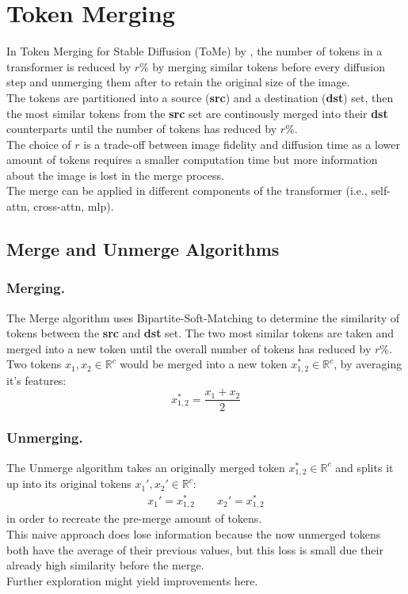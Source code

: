 \section{Token Merging}
In Token Merging for Stable Diffusion (ToMe) by \cite{bolya2023tomesd}, the number of tokens in a transformer is reduced by \(r\)\% by merging similar tokens before every diffusion step and unmerging them after to retain the original size of the image.\\
The tokens are partitioned into a source (\textbf{src}) and a destination (\textbf{dst}) set, then the most similar tokens from the \textbf{src} set are continously merged into their \textbf{dst} counterparts until the number of tokens has reduced by \(r\)\%.\\
The choice of \(r\) is a trade-off between image fidelity and diffusion time as a lower amount of tokens requires a smaller computation time but more information about the image is lost in the merge process.\\
The merge can be applied in different components of the transformer (i.e., self-attn, cross-attn, mlp).



\subsection{Merge and Unmerge Algorithms}
\subsubsection*{Merging.} The Merge algorithm uses Bipartite-Soft-Matching to determine the similarity of tokens between the \textbf{src} and \textbf{dst} set. The two most similar tokens are taken and merged into a new token until the overall number of tokens has reduced by \(r\%\).\\
Two tokens \(x_1, x_2 \in \mathbb{R}^c\) would be merged into a new token \(x_{1,2}^* \in \mathbb{R}^c \), by averaging it's features: \[x_{1,2}^* = \frac{x_1 + x_2}{2}\]



\subsubsection*{Unmerging.} The Unmerge algorithm takes an originally merged token $x_{1,2}^* \in \mathbb{R}^c$ and splits it up into its original tokens $x_1', x_2' \in \mathbb{R}^c$: 
\begin{align*}
    x_1' = x_{1,2}^* \quad\quad
    x_2' = x_{1,2}^*
\end{align*}
in order to recreate the pre-merge amount of tokens.\\
This naive approach does lose information because the now unmerged tokens both have the average of their previous values, but this loss is small due their already high similarity before the merge.\\ Further exploration might yield improvements here.



